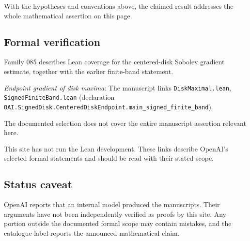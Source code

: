 \documentclass[11pt]{article}
\begin{document}
With the hypotheses and conventions above, the claimed result addresses the whole mathematical assertion on this page.

\subsection{Formal verification}
Family 085 describes Lean coverage for the centered-disk Sobolev gradient estimate, together with the earlier finite-band statement.

\textit{Endpoint gradient of disk maxima}: The manuscript links \texttt{DiskMaximal.lean}, \texttt{SignedFiniteBand.lean} (declaration \texttt{OAI.SignedDisk.CenteredDiskEndpoint.main\_signed\_finite\_band}).

The documented selection does not cover the entire manuscript assertion relevant here.

This site has not run the Lean development. These links describe OpenAI’s selected formal statements and should be read with their stated scope.

\subsection{Status caveat}
OpenAI reports that an internal model produced the manuscripts. Their arguments have not been independently verified as proofs by this site. Any portion outside the documented formal scope may contain mistakes, and the catalogue label reports the announced mathematical claim.
\end{document}
